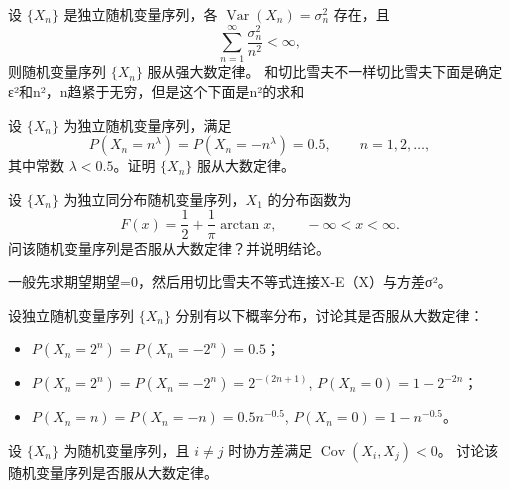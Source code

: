 \begin{theorem}
设 $\{X_n\}$ 是独立随机变量序列，各 $\operatorname{Var}(X_n)=\sigma_n^2$ 存在，且
\[
\sum_{n=1}^{\infty}\frac{\sigma_n^2}{n^2}<\infty,
\]
则随机变量序列 $\{X_n\}$ 服从强大数定律。
和切比雪夫不一样切比雪夫下面是确定ε²和n²，n趋紧于无穷，但是这个下面是n²的求和
\end{theorem}

\begin{homework}[5.4]
设 $\{X_n\}$ 为独立随机变量序列，满足
\[
P(X_n = n^\lambda) = P(X_n = -n^\lambda) = 0.5 , \qquad n=1,2,\ldots,
\]
其中常数 $\lambda<0.5$。证明 $\{X_n\}$ 服从大数定律。
\end{homework}


\begin{homework}[5.5]
设 $\{X_n\}$ 为独立同分布随机变量序列，$X_1$ 的分布函数为
\[
F(x)=\frac12 + \frac1\pi \arctan x , \qquad -\infty < x < \infty .
\]
问该随机变量序列是否服从大数定律？并说明结论。
\end{homework}

\begin{dxtips}
    一般先求期望期望=0，然后用切比雪夫不等式连接X-E（X）与方差σ²。
\end{dxtips}
\begin{homework}[5.7]
设独立随机变量序列 $\{X_n\}$ 分别有以下概率分布，讨论其是否服从大数定律：

\begin{itemize}
  \item[(1)] $P(X_n = 2^n)=P(X_n = -2^n)=0.5$；
  \item[(2)] $P(X_n = 2^n)=P(X_n = -2^n)=2^{-(2n+1)}$, 
              \quad $P(X_n=0)=1-2^{-2n}$；
  \item[(3)] $P(X_n = n)=P(X_n = -n)=0.5 n^{-0.5}$, 
              \quad $P(X_n=0)=1-n^{-0.5}$。
\end{itemize}
\end{homework}


\begin{homework}[5.8]
设 $\{X_n\}$ 为随机变量序列，且 $i\ne j$ 时协方差满足 $\operatorname{Cov}(X_i,X_j)<0$。
讨论该随机变量序列是否服从大数定律。
\end{homework}

